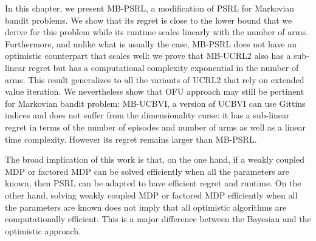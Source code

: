 In this chapter, we present MB-PSRL, a modification of PSRL for Markovian bandit problems. We show that its regret is close to the lower bound that we derive for this problem while its runtime scales linearly with the number of arms. Furthermore, and unlike what is usually the case, MB-PSRL does not have an optimistic counterpart that scales well: we prove that  MB-UCRL2 also has a sub-linear regret but has a computational complexity exponential in the number of arms. This result generalizes to all  the variants of UCRL2 that rely on extended value iteration. We nevertheless show that OFU approach may still be pertinent for Markovian bandit problem:  MB-UCBVI, a version of UCBVI can use Gittins indices and  does not suffer from the dimensionality curse: it has a sub-linear regret in terms of the number of episodes and number of arms as well as a linear time complexity. However its regret remains larger than MB-PSRL.

The broad implication of this work is that, on the one hand, if a weakly coupled MDP or factored MDP can be solved efficiently when all the parameters are known, then PSRL can be adapted to have efficient regret and runtime. On the other hand, solving weakly coupled MDP or factored MDP efficiently when all the parameters are known does not imply that all optimistic algorithms are computationally efficient. This is a major difference between the Bayesian and the optimistic approach.

\endgroup
